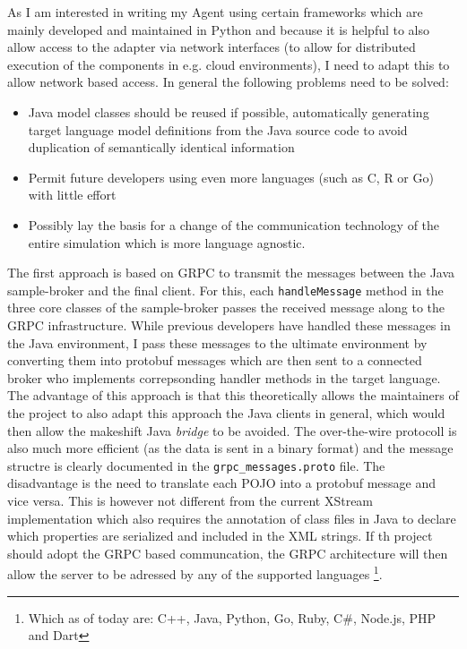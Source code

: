 As I am interested in writing my Agent using certain frameworks which are mainly developed and maintained in Python and
because it is helpful to also allow access to the adapter via network interfaces (to allow for distributed execution of
the components in e.g. cloud environments), I need to adapt this to allow network based access. In general the following
problems need to be solved:

\begin{itemize} \item Java model classes should be reused if possible, automatically generating target language model
    definitions from the Java source code to avoid duplication of semantically identical information \item Permit
    future developers using even more languages (such as C, R or Go) with little effort \item Possibly lay the basis
    for a change of the communication technology of the entire simulation which is more language agnostic.
\end{itemize}

The first approach is based on \ac{GRPC} to transmit the messages between the Java sample-broker and the final client.
For this, each \texttt{handleMessage} method in the three core classes of the sample-broker passes the received message
along to the \ac {GRPC} infrastructure. While previous developers have handled these messages in the Java environment, I
pass these messages to the ultimate environment by converting them into protobuf messages which are then sent to a
connected broker who implements correpsonding handler methods in the target language. The advantage of this approach is
that this theoretically allows the maintainers of the project to also adapt this approach the Java clients in general,
which would then allow the makeshift Java \emph{bridge} to be avoided. The over-the-wire protocoll is also much more
efficient (as the data is sent in a binary format) and the message structre is clearly documented in the
\texttt{grpc\_messages.proto} file. The disadvantage is the need to translate each \ac{POJO} into a protobuf message and
vice versa. This is however not different from the current XStream implementation which also requires the annotation of
class files in Java to declare which properties are serialized and included in the \ac {XML} strings. If th project
should adopt the \ac {GRPC} based communcation, the \ac {GRPC} architecture will then allow the server to be adressed by
any of the supported languages \footnote{Which as of today are: C++, Java, Python, Go, Ruby, C\#, Node.js, PHP and
Dart}.

